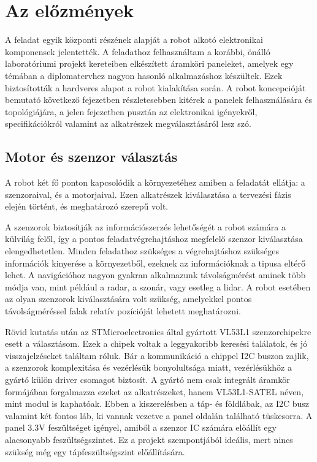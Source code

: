 \section{Az előzmények}

A feladat egyik központi részének alapját a robot alkotó elektronikai komponensek
jelentették. A feladathoz felhasználtam a korábbi, önálló laboratóriumi projekt
kereteiben elkészített áramköri paneleket, amelyek egy témában a diplomatervhez
nagyon hasonló alkalmazáshoz készültek. Ezek biztosították a hardveres alapot a
robot kialakítása során.  A robot koncepcióját bemutató következő fejezetben
részletesebben kitérek a panelek felhasználására és topológiájára, a jelen
fejezetben pusztán az elektronikai igényekről, specifikációkról valamint az
alkatrészek megválasztásáról lesz szó.

\subsection{Motor és szenzor választás}

A robot két fő ponton kapcsolódik a környezetéhez amiben a feladatát ellátja: a
szenzoraival, és a motorjaival. Ezen alkatrészek kiválasztása a tervezési fázis
elején történt, és meghatározó szerepű volt.

\medskip

A szenzorok biztosítják az információszerzés lehetőségét a robot számára a
külvilág felől, így a pontos feladatvégrehajtáshoz megfelelő szenzor kiválasztása
elengedhetetlen. Minden feladathoz szükséges a végrehajtáshoz szükséges
információk kinyerése a környezetből, ezeknek az információknak a tipusa eltérő
lehet. A navigációhoz nagyon gyakran alkalmazunk távolságmérést aminek több módja
van, mint például a radar, a szonár, vagy esetleg a lidar. A robot esetében az
olyan szenzorok kiválasztására volt szükség, amelyekkel pontos távolságméréssel
falak relatív pozícióját lehetett meghatározni.

Rövid kutatás után az STMicroelectronics által gyártott VL53L1 szenzorchipekre
esett a választásom. Ezek a chipek voltak a leggyakoribb keresési találatok, és
jó visszajelzéseket találtam róluk. Bár a kommunikáció a chippel I2C buszon
zajlik, a szenzorok komplexitása és vezérlésük bonyolultsága miatt, vezérlésükhöz
a gyártó külön driver csomagot biztosít. A gyártó nem csak integrált áramkör
formájában forgalmazza ezeket az alkatrészeket, hanem VL53L1-SATEL néven, mint
modul is kaphatóak. Ebben a kiszerelésben a táp- és földlábak, az I2C busz
valamint két fontos láb, ki vannak vezetve a panel oldalán található tüskesorra.
A panel 3.3V feszültséget igényel, amiből a szenzor IC számára előállít egy
alacsonyabb feszültségszintet. Ez a projekt szempontjából ideális, mert nincs
szükség még egy tápfeszültségszint előállítására.


